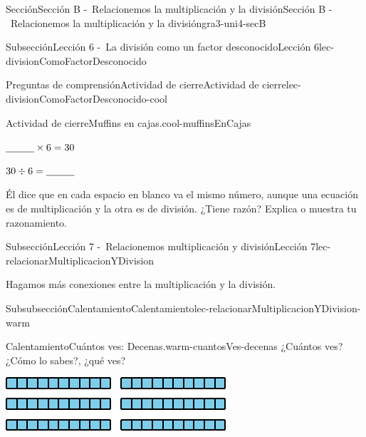 \documentclass[twoside,10pt,]{article}
\begin{document}
\begin{sectionptx}{Sección}{Sección B -~Relacionemos la multiplicación y la división}{}{Sección B -~Relacionemos la multiplicación y la división}{}{}{gra3-uni4-secB}
\begin{subsectionptx}{Subsección}{Lección 6 -~La división como un factor desconocido}{}{Lección 6}{}{}{lec-divisionComoFactorDesconocido}
\begin{reading-questions-subsubsection}{Preguntas de comprensión}{Actividad de cierre}{}{Actividad de cierre}{}{}{lec-divisionComoFactorDesconocido-cool}
\begin{project}{Actividad de cierre}{Muffins en cajas.}{cool-muffinsEnCajas}
\begin{sidebyside}{2}{0.05}{0.05}{0.1}
\begin{sbspanel}{0.4}
\end{sbspanel}%
\begin{sbspanel}{0.4}%
\(\underline{\hspace{1 cm}} \times 6 = 30\)%
\par
\(30 \div 6 = \underline{\hspace{1 cm}}\)%
\end{sbspanel}%
\end{sidebyside}%
\par
Él dice que en cada espacio en blanco va el mismo número, aunque una ecuación es de multiplicación y la otra es de división. ¿Tiene razón? Explica o muestra tu razonamiento.%
\end{project}%
\end{reading-questions-subsubsection}
\end{subsectionptx}
%
%
\typeout{************************************************}
\typeout{************************************************}
%
\begin{subsectionptx}{Subsección}{Lección 7 -~Relacionemos multiplicación y división}{}{Lección 7}{}{}{lec-relacionarMultiplicacionYDivision}
\begin{introduction}{}%
Hagamos más conexiones entre la multiplicación y la división.%
\end{introduction}%
%
%
\typeout{************************************************}
\typeout{************************************************}
%
\begin{subsubsectionptx}{Subsubsección}{Calentamiento}{}{Calentamiento}{}{}{lec-relacionarMultiplicacionYDivision-warm}
\begin{exploration}{Calentamiento}{Cuántos ves: Decenas.}{warm-cuantosVes-decenas}%
¿Cuántos ves?\\
 ¿Cómo lo sabes?, ¿qué ves?%
\begin{image}{0}{1}{0}{}%
\includegraphics[width=\linewidth]{external/svg-source/tikz-file-147480-scale13.pdf}
\end{image}%
\end{exploration}%
\end{subsubsectionptx}

\end{subsectionptx}
\end{sectionptx}
\end{document}
